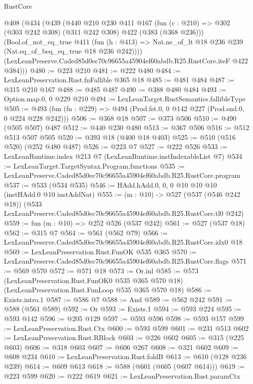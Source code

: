\begin{lexlean}{RustCore}
\begin{coremodule}
  @408
    (@434
      (@439
        (@440
          @210
          @230
          @411
          @167
          (fun (c : @210) => @302 (@303 @242 @308) (@311 @242 @308) @422 (@383 (@368 @236)))
          (Bool.of_not_eq_true
            @411
            (fun (h : @413) => Nat.ne_of_lt @18 @236 @239 (Nat.eq_of_beq_eq_true @18 @236 @242))))
        (LexLeanPreserve.Caded85d0ec70c96655a45904ef60abdb.R25.RustCore.iteF @422 @384)))
@480 := @223 @210
@481 := @222 @480
@484 := LexLeanPreservation.Rust.fnFallible @365 @18
@485 := @481 @484
@487 := @315 @210 @167
@488 := @485 @487
@490 := @388 @480 @484
@493 := Option.map.{0, 0} @229 @210
@494 := LexLeanTarget.RustSemantics.fallibleType
@505 := @493 (fun (fn : @229) => @494 (Prod.fst.{0, 0} @142 @227 (Prod.snd.{0, 0} @224 @228 @242)))
@506 := @368 @18
@507 := @373 @506
@510 := @490 (@505 @507) @487
@512 := @440 @230 @480
@513 := @367 @506
@516 := @512 @513 @507 @505
@520 := @393 @18 (@400 @18 @403)
@525 := @510 (@516 @520) (@252 @480 @487)
@526 := @223 @7
@527 := @222 @526
@533 := LexLeanRuntime.index @213 @7 (LexLeanRuntime.instIndexableList @7)
@534 := LexLeanTarget.TargetSyntax.Program.functions
@535 := LexLeanPreserve.Caded85d0ec70c96655a45904ef60abdb.R25.RustCore.program
@537 := @533 (@534 @535)
@546 := HAdd.hAdd.{0, 0, 0} @10 @10 @10 (instHAdd.{0} @10 instAddNat)
@555 := (m : @10) ->
  @527
    (@537 (@546 @242 @18))
    (@533 LexLeanPreserve.Caded85d0ec70c96655a45904ef60abdb.R25.RustCore.tl0 @242)
@559 := fun (m : @10) => @252 @526 (@537 @242)
@561 := @527 (@537 @18)
@562 := @315 @7
@564 := @561 (@562 @79)
@566 := LexLeanPreserve.Caded85d0ec70c96655a45904ef60abdb.R25.RustCore.idx0 @18
@569 := LexLeanPreservation.Rust.FunOK @535 @365
@570 := LexLeanPreserve.Caded85d0ec70c96655a45904ef60abdb.R25.RustCore.flags
@571 := @569 @570
@572 := @571 @18
@573 := Or.inl
@585 := @573
    (LexLeanPreservation.Rust.FunOK0 @535 @365 @570 @18)
    (LexLeanPreservation.Rust.FunLoop @535 @365 @570 @18)
@586 := Exists.intro.{1}
@587 := @586 @7
@588 := And
@589 := @562 @242
@591 := @588 (@561 @589)
@592 := Or
@593 := Exists.{1}
@594 := @593 @224
@595 := @593 @142
@596 := @205 @129
@597 := @593 @596
@598 := @593 @157
@599 := LexLeanPreservation.Rust.Ctx
@600 := @593 @599
@601 := @231 @513
@602 := LexLeanPreservation.Rust.RBlock
@603 := @226 @602
@605 := @315 (@225 @603)
@606 := @318 @603
@607 := @606 @267
@608 := @321 @602
@609 := @608 @234
@610 := LexLeanPreservation.Rust.foldB
@613 := @610 (@128 @236 @239)
@614 := @609 @613
@618 := @588 (@601 (@605 (@607 @614)))
@619 := @223 @599
@620 := @222 @619
@621 := LexLeanPreservation.Rust.paramCtx

\end{coremodule}
\end{lexlean}
